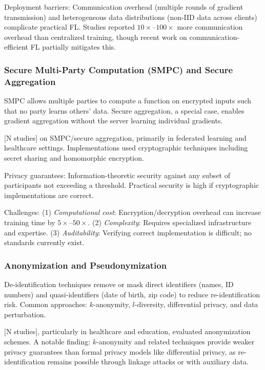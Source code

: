 \documentclass[11pt,a4paper]{article}
\begin{document}
Deployment barriers: Communication overhead (multiple rounds of gradient transmission) and heterogeneous data distributions (non-IID data across clients) complicate practical FL. Studies reported $10\times$–$100\times$ more communication overhead than centralized training, though recent work on communication-efficient FL partially mitigates this.

\subsubsection{Secure Multi-Party Computation (SMPC) and Secure Aggregation}

SMPC allows multiple parties to compute a function on encrypted inputs such that no party learns others' data. Secure aggregation, a special case, enables gradient aggregation without the server learning individual gradients.

[N studies] on SMPC/secure aggregation, primarily in federated learning and healthcare settings. Implementations used cryptographic techniques including secret sharing and homomorphic encryption.

Privacy guarantees: Information-theoretic security against any subset of participants not exceeding a threshold. Practical security is high if cryptographic implementations are correct.

Challenges: (1) \textit{Computational cost}: Encryption/decryption overhead can increase training time by $5\times$–$50\times$. (2) \textit{Complexity}: Requires specialized infrastructure and expertise. (3) \textit{Auditability}: Verifying correct implementation is difficult; no standards currently exist.

\subsubsection{Anonymization and Pseudonymization}

De-identification techniques remove or mask direct identifiers (names, ID numbers) and quasi-identifiers (date of birth, zip code) to reduce re-identification risk. Common approaches: $k$-anonymity, $l$-diversity, differential privacy, and data perturbation.

[N studies], particularly in healthcare and education, evaluated anonymization schemes. A notable finding: $k$-anonymity and related techniques provide weaker privacy guarantees than formal privacy models like differential privacy, as re-identification remains possible through linkage attacks or with auxiliary data.
\end{document}
